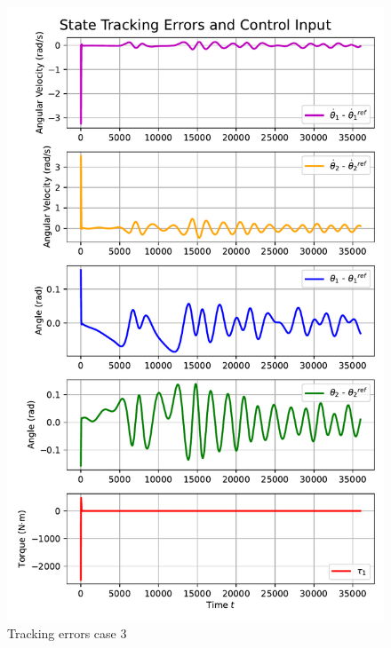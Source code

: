 \begin{figure}[htb]
    \centering
    \includegraphics[width=1\linewidth]{img/3-task3/LQR3_errors.pdf}
    \caption{Tracking errors case 3}
    \label{fig:dtheta1-evolution}
\end{figure}
